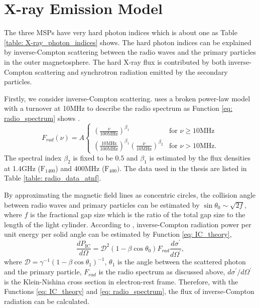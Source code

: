 \documentclass[a4paper, 12pt]{report}
\begin{document}
  \section{X-ray Emission Model}
    The three MSPs have very hard photon indices which is about one as Table 
    \ref{table: X-ray_photon_indices} shows. The hard photon indices can be explained by 
    inverse-Compton scattering between the radio waves and the primary particles in the 
    outer magnetosphere. The hard X-ray flux is contributed by both inverse-Compton 
    scattering and synchrotron radiation emitted by the secondary particles. 
    
    Firstly, we consider inverse-Compton scattering. \citet{0004-637X-787-2-167} uses a 
    broken power-law model with a turnover at 10MHz to describe the radio spectrum as 
    Function \ref{eq: radio_spectrum} shows \citep{0004-637X-787-2-167}.
    \begin{equation}
      \label{eq: radio_spectrum}
        F_{rad}\left(\nu\right) = A \left.
        \begin{cases}
          \left(\frac{\nu}{100\text{MHz}}\right)^{\beta_1} & \text{for } \nu \geq 10\text{MHz} \\
          \left(\frac{10\text{MHz}}{100\text{MHz}}\right)^{\beta_1} \left(\frac{\nu}{10\text{MHz}}\right)^{\beta_2}& \text{for } \nu > 10\text{MHz} .
        \end{cases}     
        \right.  
    \end{equation} 
    The spectral index $\beta_2$ is fixed to be $0.5$ and $\beta_1$ is estimated by the 
    flux densities at 1.4GHz ($\mbox{F}_{1400}$) and 400MHz ($\mbox{F}_{400})$. The data 
    used in the thesis are listed in Table \ref{table: radio_data_atnf}. 

    By approximating the magnetic field lines as concentric circles, the collision angle 
    between radio waves and primary particles can be estimated by 
    $\sin{\theta_0}\sim \sqrt{2f}$, where $f$ is the fractional gap size which is the 
    ratio of the total gap size to the length of the light cylinder. According to 
    \citet{0004-637X-787-2-167}, inverse-Compton radiation power per unit energy per solid 
    angle can be estimated by Function \ref{eq: IC_theory},
    \begin{equation}
      \label{eq: IC_theory}
      \frac{dP_\text{IC}}{d\Omega} = \mathcal{D}^{2}\left(1-\beta \cos{\theta_{0}}\right) F_{rad} \frac{d\sigma^{\prime}}{d\Omega^{\prime}} ,
    \end{equation}
    where  $\mathcal{D} = \gamma^{-1}\left(1-\beta\cos{\theta_1}
    \right)^{-1}$, $\theta_1$ is the angle between the scattered photon and the primary particle, 
    $F_{rad}$ is the radio spectrum 
    as discussed above, $d\sigma^{\prime}/d\Omega^{\prime}$ is the Klein-Nishina cross 
    section in electron-rest frame.
    Therefore, with the Functions \ref{eq: IC_theory} and \ref{eq: radio_spectrum}, the 
    flux of inverse-Compton radiation can be calculated. 
\end{document}
